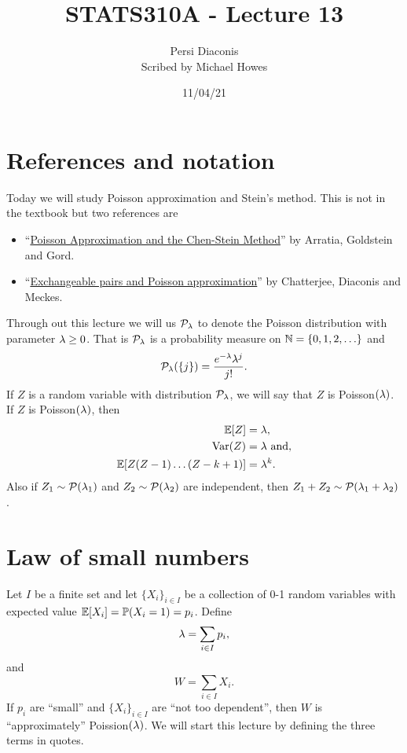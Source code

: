 



\title{STATS310A - Lecture 13}
\author{Persi Diaconis\\ Scribed by Michael Howes}
\date{11/04/21}

\pagestyle{fancy}
\fancyhf{}


\maketitle
\tableofcontents
\section{References and notation}
Today we will study Poisson approximation and Stein's method. This is not in the textbook but two references are 
\begin{itemize}
    \item ``\href{https://projecteuclid.org/journals/statistical-science/volume-5/issue-4/Poisson-Approximation-and-the-Chen-Stein-Method/10.1214/ss/1177012015.full}{Poisson Approximation and the Chen-Stein Method}'' by Arratia, Goldstein and Gord.
    \item ``\href{https://arxiv.org/abs/math/0411525}{Exchangeable pairs and Poisson approximation}'' by Chatterjee, Diaconis and Meckes.
\end{itemize}
Through out this lecture we will us ${\mathcal{P}}_\lambda$ to denote the Poisson distribution with parameter $\lambda \ge 0$. That is ${\mathcal{P}}_\lambda$ is a probability measure on ${{\mathbb N}} = \{0,1,2,\ldots\}$ and 
\[{\mathcal{P}}_\lambda(\{j\}) = \frac{e^{-\lambda}\lambda^j}{j!}.\]
If $Z$ is a random variable with distribution ${\mathcal{P}}_\lambda$, we will say that $Z$ is Poisson$(\lambda)$. If $Z$ is Poisson$(\lambda)$, then 
\begin{align*}
    {\mathbb{E}}[Z]&=\lambda,\\
    \operatorname{Var}(Z)&=\lambda \text{ and},\\
    {\mathbb{E}}[Z(Z-1)\ldots(Z-k+1)]&=\lambda^k.
\end{align*}
Also if $Z_1 \sim {\mathcal{P}}(\lambda_1)$ and $Z_2 \sim {\mathcal{P}}(\lambda_2)$ are independent, then $Z_1+Z_2 \sim {\mathcal{P}}(\lambda_1+\lambda_2)$.
\section{Law of small numbers}
Let $I$ be a finite set and let $\{X_i\}_{i \in I}$ be a collection of 0-1 random variables with expected value ${\mathbb{E}}[X_i]={\mathbb{P}}(X_i=1)=p_i$. Define
\[\lambda = \sum_{i\in I} p_i, \]
and 
\[W =\sum_{i \in I}X_i. \]
If $p_i$ are ``small'' and $\{X_i\}_{i \in I}$ are ``not too dependent'', then $W$ is ``approximately'' Poission$(\lambda)$. We will start this lecture by defining the three terms in quotes.
